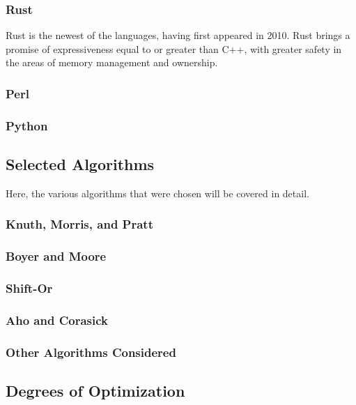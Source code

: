 \subsubsection{Rust}

Rust is the newest of the languages, having first appeared in 2010. Rust brings a promise of expressiveness equal to or greater than C++, with greater safety in the areas of memory management and ownership.

\subsubsection{Perl}

\subsubsection{Python}

\subsection{Selected Algorithms}

Here, the various algorithms that were chosen will be covered in detail.

\subsubsection{Knuth, Morris, and Pratt}

\subsubsection{Boyer and Moore}

\subsubsection{Shift-Or}

\subsubsection{Aho and Corasick}

\subsubsection{Other Algorithms Considered}

\subsection{Degrees of Optimization}

